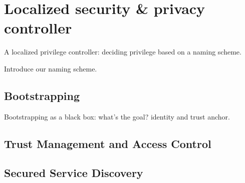 \section{Localized security \& privacy controller}

A localized privilege controller: deciding privilege based on a naming scheme.

Introduce our naming scheme.



\subsection{Bootstrapping}
Bootstrapping as a black box: what's the goal? identity and trust anchor.

\subsection{Trust Management and Access Control}

\subsection{Secured Service Discovery}
